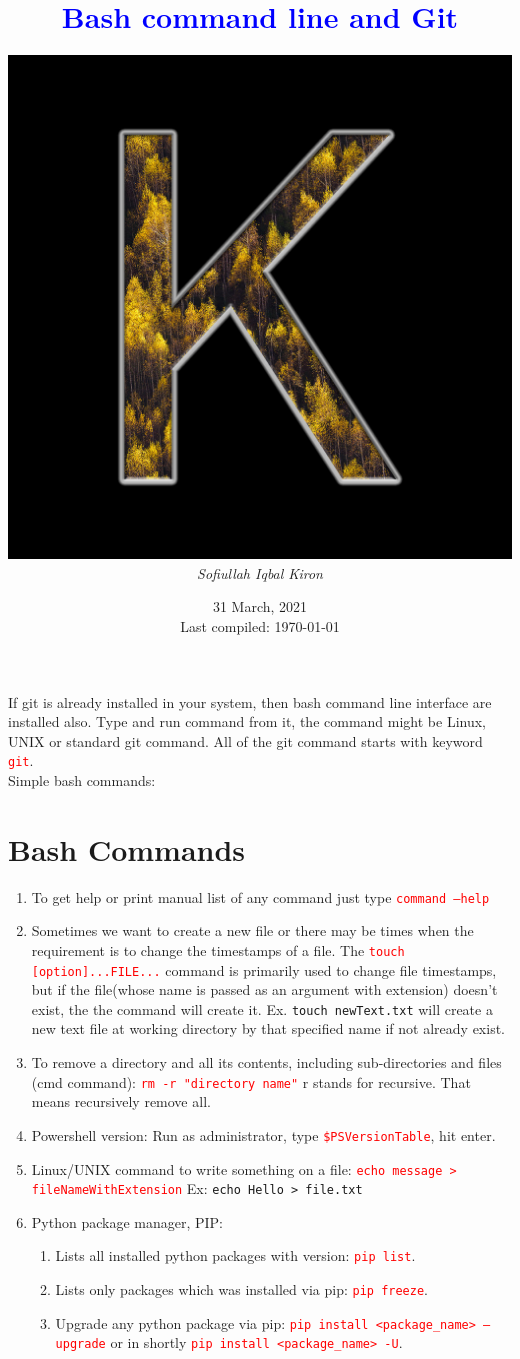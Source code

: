 \documentclass[12 pt, letterpaper]{extarticle}
\title{\textcolor{blue}{Bash command line and Git}}
\author
{
	\includegraphics[scale=0.2]{User Profile.jpg} \\ %
	\textit{Sofiullah Iqbal Kiron} \\
	\R{\rule{11 cm}{2 pt}}
}
\date{31 March, 2021 \\ {\tiny Last compiled: \today}}
\newcommand{\R}{\textcolor{red}} %
\newcommand{\T}{\texttt}
\begin{document}
\maketitle
\justify

If git is already installed in your system, then bash command line interface are installed also. Type and run command from it, the command might be Linux, UNIX or standard git command. All of the git command starts with keyword \R{\T{git}}.\\
Simple bash commands:

\section*{Bash Commands}
\begin{enumerate}
	\item To get help or print manual list of any command just type \R{\T{command --help}}
	\item Sometimes we want to create a new file or there may be times when the requirement is to change the timestamps of a file. The \R{\T{touch [option]...FILE...}} command is primarily used to change file timestamps, but if the file(whose name is passed as an argument with extension) doesn't exist, the the command will create it. Ex. \textcolor{red!70}{\texttt{touch newText.txt}} will create a new text file at working directory by that specified name if not already exist.
	\item To remove a directory and all its contents, including sub-directories and files (cmd command): \R{\T{rm -r "directory name"}} r stands for recursive. That means recursively remove all.
	\item Powershell version: Run as administrator, type \R{\T{\$PSVersionTable}}, hit enter.
	\item Linux/UNIX command to write something on a file: \R{\T{echo message > fileNameWithExtension}} Ex: \textcolor{red!70}{\texttt{echo Hello > file.txt}}

	\item Python package manager, PIP:
	      \begin{enumerate}
		      \item Lists all installed python packages with version: \R{\T{pip list}}.
		      \item Lists only packages which was installed via pip: \R{\T{pip freeze}}.
		      \item Upgrade any python package via pip: \R{\T{pip install <package\_name> --upgrade}} or in shortly \R{\T{pip install <package\_name> -U}}.
	      \end{enumerate}


\end{enumerate}
\end{document}
